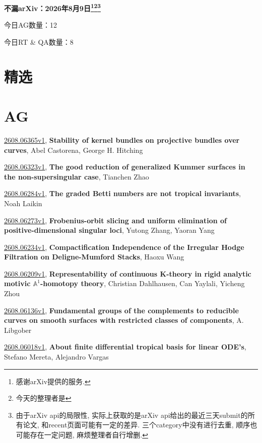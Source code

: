 \documentclass[9pt, a4paper]{article}
\theoremstyle{plain}
\theoremstyle{definition}
\theoremstyle{remark}
\newcommand{\arxiv}[3]{\href{https://arxiv.org/abs/#1}{#1}, \textbf{\textcolor{arxivblue}{#2}}, #3}
\newcommand{\AGnumber}{12}
\newcommand{\RTQAnumber}{8}
\newcommand{\NewestDate}{2026年8月9日}
\newcommand{\todayarXiver}{} %
\begin{document}
\begin{center}
    \Huge\textbf{不漏arXiv：\NewestDate\footnote{感谢arXiv提供的服务.}\footnote{今天的整理者是\todayarXiver}\footnote{由于arXiv api的局限性, 实际上获取的是arXiv api给出的最近三天submit的所有论文, 和recent页面可能有一定的差异. 三个category中没有进行去重, 顺序也可能存在一定问题, 麻烦整理者自行增删.}} \\
\end{center}

\setcounter{section}{-1}

\begin{center}
    今日AG数量：\AGnumber
    
    今日RT \& QA数量：\RTQAnumber
    
\end{center}


\section{精选}


\section{AG}
\arxiv{2608.06365v1}{Stability of kernel bundles on projective bundles over curves}{Abel Castorena, George H. Hitching}

\arxiv{2608.06323v1}{The good reduction of generalized Kummer surfaces in the non-supersingular case}{Tianchen Zhao}

\arxiv{2608.06284v1}{The graded Betti numbers are not tropical invariants}{Noah Laikin}

\arxiv{2608.06273v1}{Frobenius-orbit slicing and uniform elimination of positive-dimensional singular loci}{Yutong Zhang, Yaoran Yang}

\arxiv{2608.06234v1}{Compactification Independence of the Irregular Hodge Filtration on Deligne-Mumford Stacks}{Haoxu Wang}

\arxiv{2608.06209v1}{Representability of continuous K-theory in rigid analytic motivic $\mathbb{A}^1$-homotopy theory}{Christian Dahlhausen, Can Yaylali, Yicheng Zhou}

\arxiv{2608.06136v1}{Fundamental groups of the complements to reducible curves on smooth surfaces with restricted classes of components}{A. Libgober}

\arxiv{2608.06018v1}{About finite differential tropical basis for linear ODE's}{Stefano Mereta, Alejandro Vargas}
\end{document}
